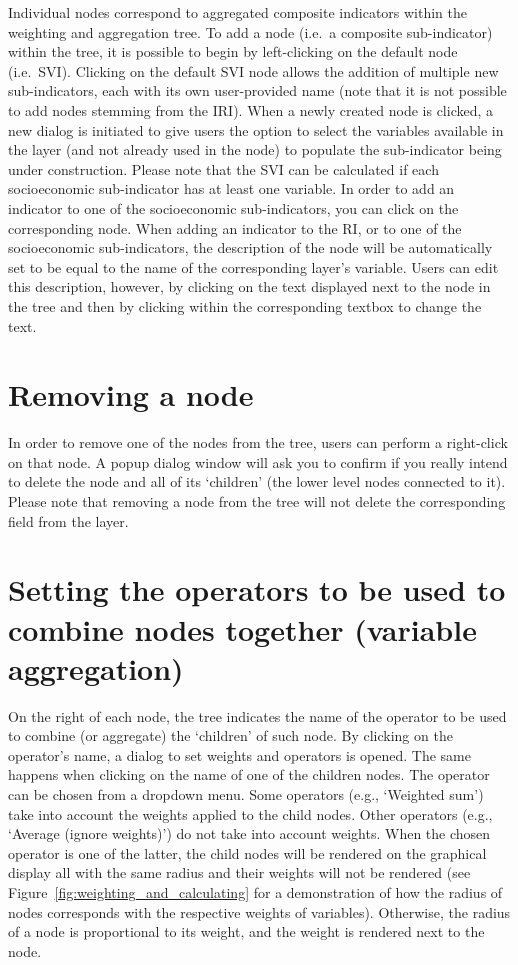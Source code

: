 Individual nodes correspond to aggregated composite indicators within the
weighting and aggregation tree. To add a node (i.e.\ a composite sub-indicator)
within the tree, it is possible to begin by left-clicking on the default node
(i.e.\ SVI).  Clicking on the default SVI node allows the addition of multiple
new sub-indicators, each with its own user-provided name (note that it is not
possible to add nodes stemming from the IRI). When a newly created node is
clicked, a new dialog is initiated to give users the option to select the
variables available in the layer (and not already used in the node) to populate
the sub-indicator being under construction. Please note that the SVI can be
calculated if each socioeconomic sub-indicator has at least one variable. In
order to add an indicator to one of the socioeconomic sub-indicators, you can
click on the corresponding node. When adding an indicator to the RI, or to one
of the socioeconomic sub-indicators, the description of the node will be
automatically set to be equal to the name of the corresponding layer's
variable. Users can edit this description, however, by clicking on the text
displayed next to the node in the tree and then by clicking within the
corresponding textbox to change the text.


\section{Removing a node}

In order to remove one of the nodes from the tree, users can perform a
right-click on that node. A popup dialog window will ask you to confirm if you
really intend to delete the node and all of its `children' (the lower level
nodes connected to it). Please note that removing a node from the tree will not
delete the corresponding field from the layer.


\section{Setting the operators to be used to combine nodes together
(variable aggregation)}
\label{sec:setting_operators}

On the right of each node, the tree indicates the name of the operator to be
used to combine (or aggregate) the `children' of such node. By clicking on the
operator's name, a dialog to set weights and operators is opened. The same
happens when clicking on the name of one of the children nodes. The operator
can be chosen from a dropdown menu. Some operators (e.g., `Weighted sum') take
into account the weights applied to the child nodes. Other operators (e.g.,
`Average (ignore weights)') do not take into account weights. When the chosen
operator is one of the latter, the child nodes will be rendered on the
graphical display all with the same radius and their weights will not be
rendered (see Figure~\ref{fig:weighting_and_calculating} for a demonstration of
how the radius of nodes corresponds with the respective weights of variables).
Otherwise, the radius of a node is proportional to its weight, and the weight
is rendered next to the node.


